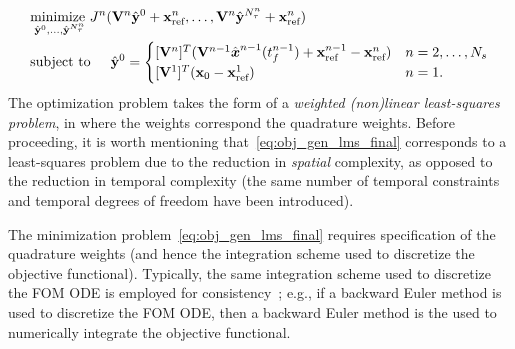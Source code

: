\begin{equation}\label{eq:obj_gen_lms_final}
\begin{split}
& \underset{\genstateyDiscreteArg{0},\ldots,\genstateyDiscreteArg{\nstepsArg{n}}}{\text{minimize } }
\objectiveArgLMS{n} (\basisspaceArg{n} \genstateyDiscreteArg{0} + \stateInterceptArg{n},\ldots,\basisspaceArg{n} \genstateyDiscreteArg{\nstepsArg{n}} + \stateInterceptArg{n}) \\ 
& \text{subject to} \hspace{0.2 in}
\genstateyDiscreteArg{0} =
\begin{cases} \spatialIC & n = 2,\ldots,\nslabs \\
\genstateICOne& n=1. \end{cases} 
\end{split}
\end{equation}
The optimization problem takes the form of a \textit{weighted (non)linear least-squares problem}, 
in where the weights correspond the quadrature weights.  
Before proceeding, it is worth mentioning that~\eqref{eq:obj_gen_lms_final} corresponds to a least-squares problem due
to the reduction in \textit{spatial} complexity, as opposed to the reduction
in temporal complexity (the same  number of temporal constraints and temporal 
degrees of freedom have been introduced).
 
The minimization problem~\eqref{eq:obj_gen_lms_final} requires specification of the quadrature weights (and hence the integration scheme used to discretize 
the objective functional). Typically, the same integration scheme used to discretize the FOM ODE is employed for consistency~\cite{colloc_review}; e.g., if a  
backward Euler method is used to discretize the FOM ODE, then a backward Euler method is the used to numerically integrate the objective functional.

